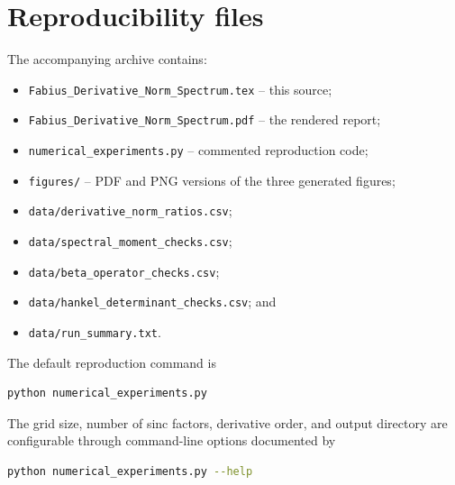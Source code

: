 \documentclass[11pt,oneside]{article}
\numberwithin{equation}{section}
\theoremstyle{plain}
\theoremstyle{definition}
\theoremstyle{remark}
\begin{document}
\section{Reproducibility files}
\label{app:reproducibility}

The accompanying archive contains:
\begin{itemize}
\item \texttt{Fabius\_Derivative\_Norm\_Spectrum.tex} -- this source;
\item \texttt{Fabius\_Derivative\_Norm\_Spectrum.pdf} -- the rendered report;
\item \texttt{numerical\_experiments.py} -- commented reproduction code;
\item \texttt{figures/} -- PDF and PNG versions of the three generated figures;
\item \texttt{data/derivative\_norm\_ratios.csv};
\item \texttt{data/spectral\_moment\_checks.csv};
\item \texttt{data/beta\_operator\_checks.csv};
\item \texttt{data/hankel\_determinant\_checks.csv}; and
\item \texttt{data/run\_summary.txt}.
\end{itemize}

The default reproduction command is
\begin{lstlisting}[style=code,language=bash]
python numerical_experiments.py
\end{lstlisting}
The grid size, number of sinc factors, derivative order, and output directory are configurable
through command-line options documented by
\begin{lstlisting}[style=code,language=bash]
python numerical_experiments.py --help
\end{lstlisting}
\end{document}
